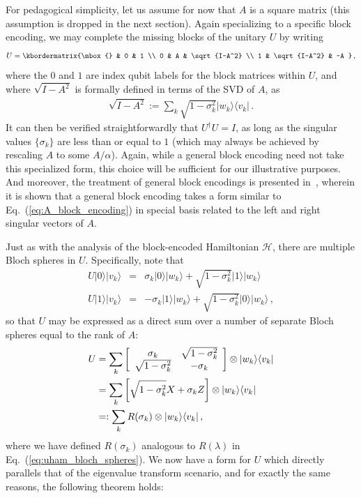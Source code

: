 \documentclass[aps,pra,showpacs,notitlepage,twocolumn,superscriptaddress,nofootinbib]{revtex4-1}
\def\>{\rangle}
\def\<{\langle}
\newcommand{\bea}{\begin{eqnarray}}
\newcommand{\eea}{\end{eqnarray}}
\newcommand{\mattwocb}[4]{\left[
	\begin{array}{cc}{#1}&{#2}\\{#3}&{#4}\end{array}\right]}
\def\lbL{\lb\rule{0pt}{2.4ex}}
\def\lb{\left[}			\def\rb{\right]}
\begin{document}
For pedagogical simplicity, let us assume for now that $A$ is a square matrix (this assumption is dropped in the next section). Again specializing to a specific block encoding, we may complete the missing blocks of the unitary $U$ by writing
    \bea
    \label{eq:A_block_encoding}
        U = \kbordermatrix{\mbox{} & 0 & 1 \\
          0 & A                 & \sqrt{I-A^2} \\
          1 & \sqrt{I-A^2}  & -A
          }
        \,,
    \eea
where the $0$ and $1$ are index qubit labels for the block matrices within $U$, and where $\sqrt{I-A^2}$ is formally defined in terms of the SVD of $A$, as
    \bea
    	\sqrt{I-A^2} := \sum_{k} \sqrt{1-\sigma_k^2} |w_k\>\<v_k|
        \,.
    \eea
It can then be verified straightforwardly that $U^\dagger U = I$, as long as the singular values $\{\sigma_k\}$ are less than or equal to $1$ (which may always be achieved by rescaling $A$ to some $A/\alpha$). Again, while a general block encoding need not take this specialized form, this choice will be sufficient for our illustrative purposes. And moreover, the treatment of general block encodings is presented in~\cite{Gily_n_2019}, wherein it is shown that a general block encoding takes a form similar to Eq.~(\ref{eq:A_block_encoding}) in special basis related to the left and right singular vectors of $A$. 

Just as with the analysis of the block-encoded Hamiltonian $\mathcal{H}$, there are multiple Bloch spheres in $U$. Specifically, note that
    \bea
        U |0\>|v_k\> &=&  \sigma_k |0\>|w_k\> + \sqrt{1-\sigma_k^2} |1\>|w_k\> \\
        U |1\>|v_k\> &=& -\sigma_k |1\>|w_k\> + \sqrt{1-\sigma_k^2} |0\>|w_k\>
        \,,
    \eea
so that $U$ may be expressed as a direct sum over a number of separate Bloch spheres equal to the rank of $A$:
    \begin{align}\label{eq:svd_bloch_spheres}
        \begin{aligned}
            U &= \sum_{k} \mattwocb{\sigma_k}{\sqrt{1-\sigma_k^2}}{\sqrt{1-\sigma_k^2}}{-\sigma_k} \otimes |w_k\>\<v_k| 
            \\
            &= \sum_{k} \lbL{ \sqrt{1-\sigma_k^2} X + \sigma_k Z }\rb  \otimes |w_k\>\<v_k| 
            \\
            &=: \sum_{k}  R(\sigma_k)  \otimes |w_k\>\<v_k| 
            \,,
        \end{aligned}
    \end{align}
where we have defined $R(\sigma_k)$ analogous to $R(\lambda)$ in Eq.~(\ref{eq:uham_bloch_spheres}). We now have a form for $U$ which directly parallels that of the eigenvalue transform scenario, and for exactly the same reasons, the following theorem holds: 
\end{document}
